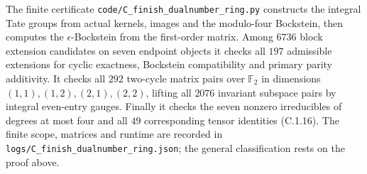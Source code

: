 The finite certificate \texttt{code/C\_finish\_dualnumber\_ring.py}
constructs the integral Tate groups from actual kernels, images and
the modulo-four Bockstein, then computes the $\epsilon$-Bockstein
from the first-order matrix. Among $6736$ block extension candidates
on seven endpoint objects it checks all $197$ admissible extensions
for cyclic exactness, Bockstein compatibility and primary parity
additivity. It checks all $292$ two-cycle matrix pairs over
$\mathbb F_2$ in dimensions $(1,1),(1,2),(2,1),(2,2)$, lifting
all $2076$ invariant subspace pairs by integral even-entry gauges.
Finally it checks the seven nonzero irreducibles of degrees at most
four and all $49$ corresponding tensor identities (C.1.16).
The finite scope, matrices and runtime are recorded in
\texttt{logs/C\_finish\_dualnumber\_ring.json}; the general
classification rests on the proof above.
